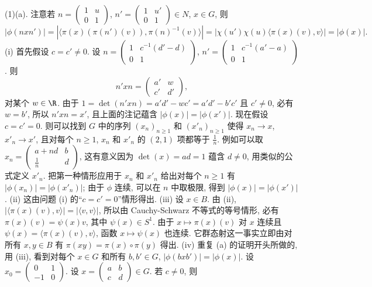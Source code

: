 \begin{solution}
(1)(a). 注意若 $n = \begin{pmatrix} 1 & u \\ 0 & 1 \end{pmatrix}$, $n' = \begin{pmatrix} 1 & u' \\ 0 & 1 \end{pmatrix} \in N$, $x \in G$, 则
\[
|\phi(nxn')| = |\langle \pi(x)(\pi(n')(v)), \pi(n)^{-1}(v) \rangle| = |\chi(u')\chi(u)\langle \pi(x)(v), v \rangle| = |\phi(x)|.
\]
(i) 首先假设 $c = c' \neq 0$. 设 $n = \begin{pmatrix} 1 & c^{-1}(d' - d) \\ 0 & 1 \end{pmatrix}$, $n' = \begin{pmatrix} 1 & c^{-1}(a' - a) \\ 0 & 1 \end{pmatrix}$. 则
\[
n'xn = \begin{pmatrix} a' & w \\ c' & d' \end{pmatrix},
\]
对某个 $w \in \R$. 由于 $1 = \det(n'xn) = a'd' - wc' = a'd' - b'c'$ 且 $c' \neq 0$, 必有 $w = b'$, 所以 $n'xn = x'$, 且上面的注记蕴含 $|\phi(x)| = |\phi(x')|$.
现在假设 $c = c' = 0$. 则可以找到 $G$ 中的序列 $(x_n)_{n \geq 1}$ 和 $(x'_n)_{n \geq 1}$ 使得 $x_n \to x$, $x'_n \to x'$, 且对每个 $n \geq 1$, $x_n$ 和 $x'_n$ 的 $(2,1)$ 项都等于 $\frac{1}{n}$. 例如可以取 $x_n = \begin{pmatrix} a + nd & b \\ \frac{1}{n} & d \end{pmatrix}$, 这有意义因为 $\det(x) = ad = 1$ 蕴含 $d \neq 0$, 用类似的公式定义 $x'_n$. 把第一种情形应用于 $x_n$ 和 $x'_n$ 给出对每个 $n \geq 1$ 有 $|\phi(x_n)| = |\phi(x'_n)|$; 由于 $\phi$ 连续, 可以在 $n$ 中取极限, 得到 $|\phi(x)| = |\phi(x')|$.
(ii) 这由问题 (i) 的``$c = c' = 0$''情形得出.
(iii) 设 $x \in B$. 由 (ii), $|\langle \pi(x)(v), v \rangle| = |\langle v, v \rangle|$, 所以由 Cauchy-Schwarz 不等式的等号情形, 必有 $\pi(x)(v) = \psi(x)v$, 其中 $\psi(x) \in S^1$. 由于 $x \longmapsto \pi(x)(v)$ 对 $x$ 连续且 $\psi(x) = \langle \pi(x)(v), v \rangle$, 函数 $x \longmapsto \psi(x)$ 也连续. 它群态射这一事实立即由对所有 $x, y \in B$ 有 $\pi(xy) = \pi(x) \circ \pi(y)$ 得出.
(iv) 重复 (a) 的证明开头所做的, 用 (iii), 看到对每个 $x \in G$ 和所有 $b, b' \in G$, $|\phi(bxb')| = |\phi(x)|$. 设 $x_0 = \begin{pmatrix} 0 & 1 \\ -1 & 0 \end{pmatrix}$. 设 $x = \begin{pmatrix} a & b \\ c & d \end{pmatrix} \in G$. 若 $c \neq 0$, 则

\end{solution}
